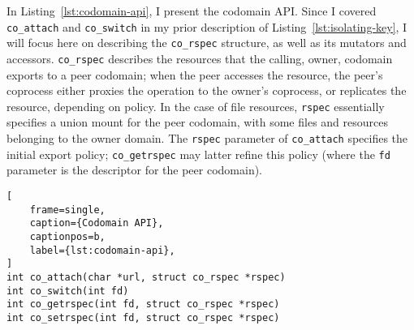 %
In Listing~\ref{lst:codomain-api}, I present the codomain API\@.
%
Since I covered \texttt{co\_attach} and \texttt{co\_switch} in my prior
description of Listing~\ref{lst:isolating-key}, I will focus here on describing
the \texttt{co\_rspec} structure, as well as its mutators and accessors.
%
\texttt{co\_rspec} describes the resources that the calling, owner, codomain
exports to a peer codomain; when the peer accesses the resource, the peer's
coprocess either proxies the operation to the owner's coprocess, or replicates
the resource, depending on policy.
%
In the case of file resources, \texttt{rspec} essentially specifies a union
mount for the peer codomain, with some files and resources belonging to the
owner domain.
%
The \texttt{rspec} parameter of \texttt{co\_attach} specifies the initial
export policy; \texttt{co\_getrspec} may latter refine this policy (where
the \texttt{fd} parameter is the descriptor for the peer codomain).

\begin{lstlisting}[
    frame=single,
    caption={Codomain API},
    captionpos=b,
    label={lst:codomain-api},
]
int co_attach(char *url, struct co_rspec *rspec)
int co_switch(int fd)
int co_getrspec(int fd, struct co_rspec *rspec)
int co_setrspec(int fd, struct co_rspec *rspec)
\end{lstlisting}

%


